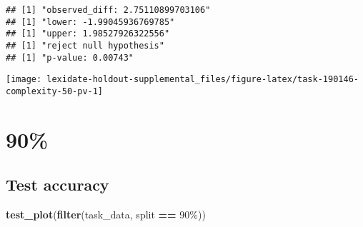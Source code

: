 \documentclass[
]{book}
\newenvironment{Shaded}{\begin{snugshade}}{\end{snugshade}}
\newcommand{\AttributeTok}[1]{\textcolor[rgb]{0.13,0.29,0.53}{#1}}
\newcommand{\DecValTok}[1]{\textcolor[rgb]{0.00,0.00,0.81}{#1}}
\newcommand{\FunctionTok}[1]{\textcolor[rgb]{0.13,0.29,0.53}{\textbf{#1}}}
\newcommand{\NormalTok}[1]{#1}
\newcommand{\OtherTok}[1]{\textcolor[rgb]{0.56,0.35,0.01}{#1}}
\newcommand{\SpecialCharTok}[1]{\textcolor[rgb]{0.81,0.36,0.00}{\textbf{#1}}}
\newcommand{\StringTok}[1]{\textcolor[rgb]{0.31,0.60,0.02}{#1}}
\begin{document}
\begin{Shaded}
\end{Shaded}

\begin{verbatim}
## [1] "observed_diff: 2.75110899703106"
## [1] "lower: -1.99045936769785"
## [1] "upper: 1.98527926322556"
## [1] "reject null hypothesis"
## [1] "p-value: 0.00743"
\end{verbatim}

\texttt{[image: lexidate-holdout-supplemental\_files/figure-latex/task-190146-complexity-50-pv-1]}

\hypertarget{section-18}{%
\section{90\%}\label{section-18}}

\hypertarget{test-accuracy-18}{%
\subsection{Test accuracy}\label{test-accuracy-18}}

\begin{Shaded}
\begin{Highlighting}[]
\FunctionTok{test\_plot}\NormalTok{(}\FunctionTok{filter}\NormalTok{(task\_data, split }\SpecialCharTok{==} \StringTok{\textquotesingle{}90\%\textquotesingle{}}\NormalTok{))}
\end{Highlighting}
\end{Shaded}
\end{document}
